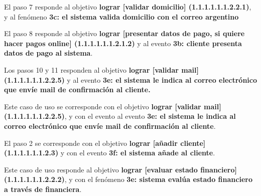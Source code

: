 El paso 7 responde al objetivo \textbf{lograr [validar domicilio] (1.1.1.1.1.1.2.2.1)}, y al fenómeno \textbf{3c: el sistema valida domicilio con el correo argentino}

El paso 8 responde al objetivo \textbf{lograr [presentar datos de pago, si quiere hacer pagos online] (1.1.1.1.1.1.2.1.2)} y al evento \textbf{3b: cliente presenta datos de pago al sistema}.

Los pasos 10 y 11 responden al objetivo \textbf{lograr [validar mail] (1.1.1.1.1.1.2.2.5)} y al evento \textbf{3e: el sistema le indica al correo electrónico que envíe mail de confirmación al cliente.}

%
%
\begin{casodeuso}
\end{casodeuso}

Este caso de uso se corresponde con el objetivo \textbf{lograr [validar mail] (1.1.1.1.1.1.2.2.5)}, y con el evento al evento \textbf{3e: el sistema le indica al correo electrónico que envíe mail de confirmación al cliente}.

El paso 2 se corresponde con el objetivo \textbf{lograr [añadir cliente] (1.1.1.1.1.1.2.3)} y con el evento \textbf{3f: el sistema añade al cliente}.

%
%
\begin{casodeuso}
  \cupre{}
  \cupost{}
\end{casodeuso}

Este caso de uso responde al objetivo \textbf{lograr [evaluar estado financiero] (1.1.1.1.1.1.2.2.2)}, y con el fenómeno \textbf{3e: sistema evalúa estado financiero a través de financiera}.


